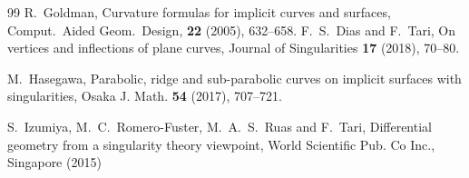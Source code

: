 \documentclass[12pt]{amsart}
\theoremstyle{plain}
\theoremstyle{definition}
\begin{document}
\begin{thebibliography}{99}
R.~Goldman, 
Curvature formulas for implicit curves and surfaces, 
Comput.\ Aided Geom.\ Design, \textbf{22} (2005), 632--658.
F.~S.~Dias and F.~Tari, 
On vertices and inflections of plane curves, 
Journal of Singularities \textbf{17} (2018), 70--80.

M.~Hasegawa,
Parabolic, ridge and sub-parabolic curves on implicit surfaces with singularities,
Osaka J. Math. \textbf{54} (2017), 707--721. 

S.~Izumiya, M.~C.~Romero-Fuster, M.~A.~S.~Ruas and F.~Tari, 
Differential geometry from a singularity theory viewpoint, 
World Scientific Pub. Co Inc., Singapore (2015)


\end{thebibliography}
\end{document}
